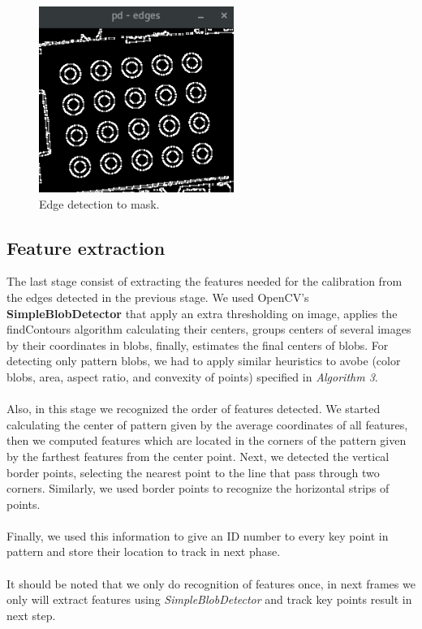 \documentclass[journal]{IEEEtran}
\begin{document}
\begin{figure}[H]
\centering
\includegraphics[width=2.5in]{_img/img_report2_edges.png}
\caption{Edge detection to mask.}
\end{figure}

\subsection{Feature extraction}
The last stage consist of extracting the features needed for the calibration from the edges detected in the previous stage. We used OpenCV's \textbf{SimpleBlobDetector} that apply an extra thresholding on image, applies the findContours algorithm calculating their centers, groups centers of several images by their coordinates in blobs, finally, estimates the final centers of blobs. For detecting only pattern blobs, we had to apply similar heuristics to avobe (color blobs, area, aspect ratio, and convexity of points) specified in \textit{Algorithm 3}.
\\
\\
Also, in this stage we recognized the order of features detected. We started calculating the center of pattern given by the average coordinates of all features, then we computed features which are located in the corners of the pattern given by the farthest features from the center point. Next, we detected the vertical border points, selecting the nearest point to the line that pass through two corners. Similarly, we used border points to recognize the horizontal strips of points.
\\
\\ 
Finally, we used this information to give an ID number to every key point in pattern and store their location to track in next phase.
\\
\\
It should be noted that we only do recognition of features once, in next frames we only will extract features using \textit{SimpleBlobDetector} and track key points result in next step.
\end{document}
